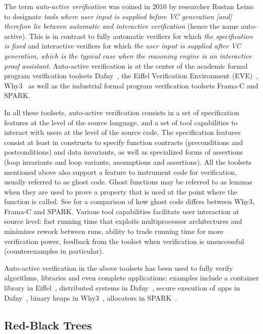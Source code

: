 \documentclass[11pt,a4paper]{article}
\newcommand{\spark}{SPARK\xspace}
\begin{document}
The term \emph{auto-active verification} was coined in 2010 by researcher
Rustan Leino~\cite{Leino10usableauto-active} to designate \textit{tools where
  user input is supplied before VC generation [and] therefore lie between
  automatic and interactive verification} (hence the name auto-active). This is
in contrast to fully automatic verifiers for which \textit{the specification is
  fixed} and interactive verifiers for which \textit{the user input is supplied
  after VC generation, which is the typical case when the reasoning engine is
  an interactive proof assistant}. Auto-active verification is at the center of
the academic formal program verification toolsets Dafny~\cite{Leino2010Dafny},
the Eiffel Verification Environment (EVE)~\cite{Furia2016},
Why3~\cite{filliatre2013Why3} as well as the industrial formal program
verification toolsets Frama-C and \spark.

In all these toolsets, auto-active verification consists in a set of
specification features at the level of the source language, and a set of tool
capabilities to interact with users at the level of the source code. The
specification features consist at least in constructs to specify function
contracts (preconditions and postconditions) and data invariants, as well as
specialized forms of assertions (loop invariants and loop variants, assumptions
and assertions). All the toolsets mentioned above also support a feature to
instrument code for verification, usually referred to as ghost code. Ghost
functions may be referred to as lemmas when they are used to prove a property
that is used at the point where the function is called. See
\cite{kosmatov:hal-01344110} for a comparison of how ghost code differs between
Why3, Frama-C and \spark. Various tool capabilities facilitate user interaction
at source level: fast running time that exploits multiprocessor architectures
and minimizes rework between runs, ability to trade running time for more
verification power, feedback from the toolset when verification is unsuccessful
(counterexamples in particular).

Auto-active verification in the above toolsets has been used to fully verify
algorithms, libraries and even complete applications: examples include a
container library in Eiffel~\cite{Polikarpova2015}, distributed systems in
Dafny~\cite{Hawblitzel2015IronFleet}, secure execution of apps in
Dafny~\cite{Hawblitzel2014Ironclad}, binary heaps in Why3~\cite{tafat11rr},
allocators in \spark~\cite{Dross2016}.

\subsection{Red-Black Trees}
\label{sec-prelim-rbt}
\end{document}
